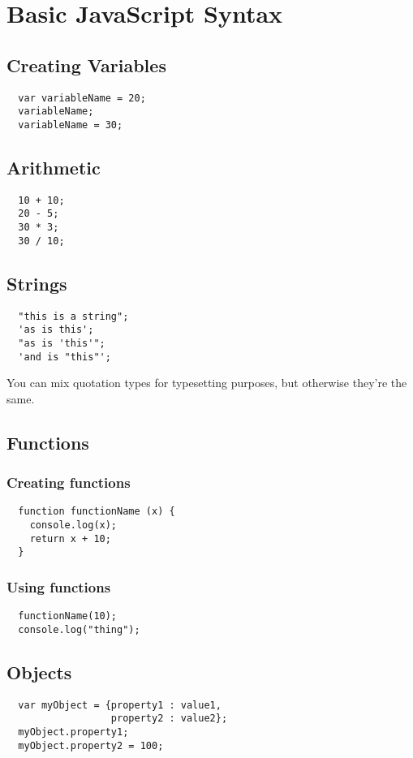 \documentclass[letterpage,foldmark,10pt]{leaflet}
\begin{document}
\section{Basic JavaScript Syntax}
\subsection{Creating Variables}
\begin{verbatim}
  var variableName = 20;
  variableName;
  variableName = 30;
\end{verbatim}
\subsection{Arithmetic}
\begin{verbatim}
  10 + 10;
  20 - 5;
  30 * 3;
  30 / 10;
\end{verbatim}
\subsection{Strings}
\begin{verbatim}
  "this is a string";
  'as is this';
  "as is 'this'";
  'and is "this"';
\end{verbatim}
\begin{framed}
  You can mix quotation types for typesetting purposes, but otherwise they're the same.
\end{framed}
\subsection{Functions}
\subsubsection{Creating functions}
\begin{verbatim}
  function functionName (x) {
    console.log(x);
    return x + 10;
  }
\end{verbatim}
\subsubsection{Using functions}
\begin{verbatim}
  functionName(10);
  console.log("thing");
\end{verbatim}
\subsection{Objects}
\begin{verbatim}
  var myObject = {property1 : value1, 
                  property2 : value2};
  myObject.property1;
  myObject.property2 = 100;
\end{verbatim}
\end{document}
